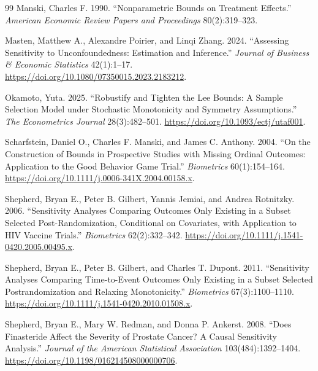 \documentclass[11pt]{article}
\theoremstyle{definition}
\theoremstyle{plain}
\theoremstyle{remark}
\begin{document}
\begin{thebibliography}{99}
Manski, Charles F. 1990. ``Nonparametric Bounds on Treatment Effects.'' \emph{American Economic Review Papers and Proceedings} 80(2):319--323.

Masten, Matthew A., Alexandre Poirier, and Linqi Zhang. 2024. ``Assessing Sensitivity to Unconfoundedness: Estimation and Inference.'' \emph{Journal of Business \& Economic Statistics} 42(1):1--17. \url{https://doi.org/10.1080/07350015.2023.2183212}.

Okamoto, Yuta. 2025. ``Robustify and Tighten the Lee Bounds: A Sample Selection Model under Stochastic Monotonicity and Symmetry Assumptions.'' \emph{The Econometrics Journal} 28(3):482--501. \url{https://doi.org/10.1093/ectj/utaf001}.

Scharfstein, Daniel O., Charles F. Manski, and James C. Anthony. 2004. ``On the Construction of Bounds in Prospective Studies with Missing Ordinal Outcomes: Application to the Good Behavior Game Trial.'' \emph{Biometrics} 60(1):154--164. \url{https://doi.org/10.1111/j.0006-341X.2004.00158.x}.

Shepherd, Bryan E., Peter B. Gilbert, Yannis Jemiai, and Andrea Rotnitzky. 2006. ``Sensitivity Analyses Comparing Outcomes Only Existing in a Subset Selected Post-Randomization, Conditional on Covariates, with Application to HIV Vaccine Trials.'' \emph{Biometrics} 62(2):332--342. \url{https://doi.org/10.1111/j.1541-0420.2005.00495.x}.

Shepherd, Bryan E., Peter B. Gilbert, and Charles T. Dupont. 2011. ``Sensitivity Analyses Comparing Time-to-Event Outcomes Only Existing in a Subset Selected Postrandomization and Relaxing Monotonicity.'' \emph{Biometrics} 67(3):1100--1110. \url{https://doi.org/10.1111/j.1541-0420.2010.01508.x}.

Shepherd, Bryan E., Mary W. Redman, and Donna P. Ankerst. 2008. ``Does Finasteride Affect the Severity of Prostate Cancer? A Causal Sensitivity Analysis.'' \emph{Journal of the American Statistical Association} 103(484):1392--1404. \url{https://doi.org/10.1198/016214508000000706}.


\end{thebibliography}
\end{document}
